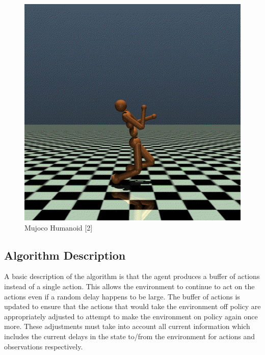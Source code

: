 \documentclass{article} %
\begin{document}
\begin{figure}[H]
\begin{center}
\includegraphics[scale=0.2]{images/mujoco_humanoid_static}
\end{center}
\caption{Mujoco Humanoid [2]}
\label{mujoco_Humanoid}
\end{figure}

\subsection{Algorithm Description}

A basic description of the algorithm is that the agent produces a buffer of actions instead of a 
single action. 
This allows the environment to continue to act on the actions even if a random delay happens to be large.
The buffer of actions is updated to ensure that the actions that would take the environment off policy
are appropriately adjusted to attempt to make the environment on policy again once more.
These adjustments must take into account all current information which includes the current delays in 
the state to/from the environment for actions and observations respectively.

\end{document}
